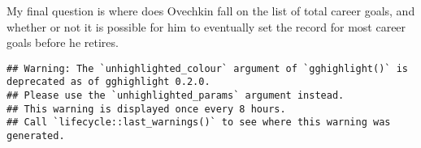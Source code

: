 \documentclass[
]{article}
\newenvironment{Shaded}{\begin{snugshade}}{\end{snugshade}}
\newcommand{\DataTypeTok}[1]{\textcolor[rgb]{0.13,0.29,0.53}{#1}}
\newcommand{\DecValTok}[1]{\textcolor[rgb]{0.00,0.00,0.81}{#1}}
\newcommand{\FloatTok}[1]{\textcolor[rgb]{0.00,0.00,0.81}{#1}}
\newcommand{\KeywordTok}[1]{\textcolor[rgb]{0.13,0.29,0.53}{\textbf{#1}}}
\newcommand{\NormalTok}[1]{#1}
\newcommand{\OperatorTok}[1]{\textcolor[rgb]{0.81,0.36,0.00}{\textbf{#1}}}
\newcommand{\StringTok}[1]{\textcolor[rgb]{0.31,0.60,0.02}{#1}}
\begin{document}
My final question is where does Ovechkin fall on the list of total
career goals, and whether or not it is possible for him to eventually
set the record for most career goals before he retires.

\begin{Shaded}
\end{Shaded}

\begin{verbatim}
## Warning: The `unhighlighted_colour` argument of `gghighlight()` is deprecated as of gghighlight 0.2.0.
## Please use the `unhighlighted_params` argument instead.
## This warning is displayed once every 8 hours.
## Call `lifecycle::last_warnings()` to see where this warning was generated.
\end{verbatim}
\end{document}
